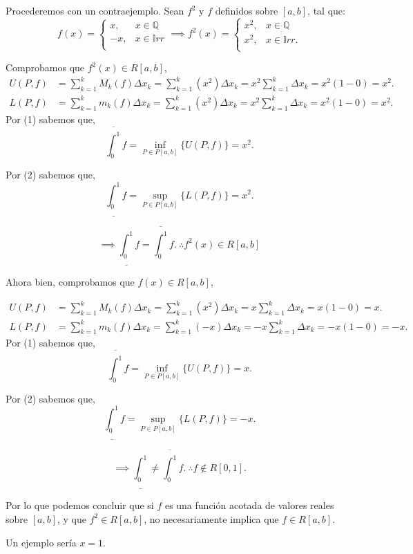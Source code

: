 \begin{sol}
	Procederemos con un contraejemplo. Sean $f^2$ y $f$ definidos sobre $[a,b]$, tal que: 
	$$f(x)=\begin{cases}
		x, & x\in \mathbb{Q}\\
		-x, & x\in \mathbb{I}rr\\
	\end{cases}\implies f^2(x)= \begin{cases}
	x^2, & x\in \mathbb{Q}\\
	x^2, & x\in \mathbb{I}rr.\\
\end{cases}$$

\linita 

Comprobamos que $f^2(x)\in R[a,b]$, 
	\begin{align}
	U(P,f) &= \sum_{k=1}^{k} M_k(f)\Delta x_k = \sum_{k=1}^{k} (x^2)\Delta x_k= x^2\sum_{k=1}^{k}\Delta x_k= x^2(1-0)= x^2.\\
	L(P,f) &= \sum_{k=1}^{k} m_k(f)\Delta x_k = \sum_{k=1}^{k} (x^2)\Delta x_k= x^2\sum_{k=1}^{k}\Delta x_k= x^2(1-0)= x^2.
\end{align}
Por (1) sabemos que, 
$$\overline{\int_0^1}f= \inf_{P\in P[a,b]}\{U(P,f)\}=x^2.$$

Por (2) sabemos que, 
$$\underline{\int_0^1}f= \sup_{P\in P[a,b]}\{L(P,f)\}=x^2.$$

$$\implies \underline{\int_0^1}f=\overline{\int_0^1}f. \ \therefore f^2(x)\in R[a,b]$$

\linita 

Ahora bien, comprobamos que $f(x)\in R[a,b]$, 


	\begin{align}
	U(P,f) &= \sum_{k=1}^{k} M_k(f)\Delta x_k = \sum_{k=1}^{k} (x^2)\Delta x_k= x\sum_{k=1}^{k}\Delta x_k= x(1-0)= x.\\
	L(P,f) &= \sum_{k=1}^{k} m_k(f)\Delta x_k = \sum_{k=1}^{k} (-x)\Delta x_k= -x\sum_{k=1}^{k}\Delta x_k= -x(1-0)= -x.
\end{align}
Por (1) sabemos que, 
$$\overline{\int_0^1}f= \inf_{P\in P[a,b]}\{U(P,f)\}=x.$$

Por (2) sabemos que, 
$$\underline{\int_0^1}f= \sup_{P\in P[a,b]}\{L(P,f)\}=-x.$$

$$\implies \underline{\int_0^1}\neq \overline{\int_0^1}f.  \ \therefore  f\not\in R[0,1].$$

\linita 

Por lo que podemos concluir que si $f$ es una función acotada de valores reales sobre $[a, b]$, y que $f^{2} \in R[a, b]$, no necesariamente implica que $f \in R[a, b]$. 

\end{sol}

\begin{cajita}
	Un ejemplo sería $x=1$. 
\end{cajita}


%
%

